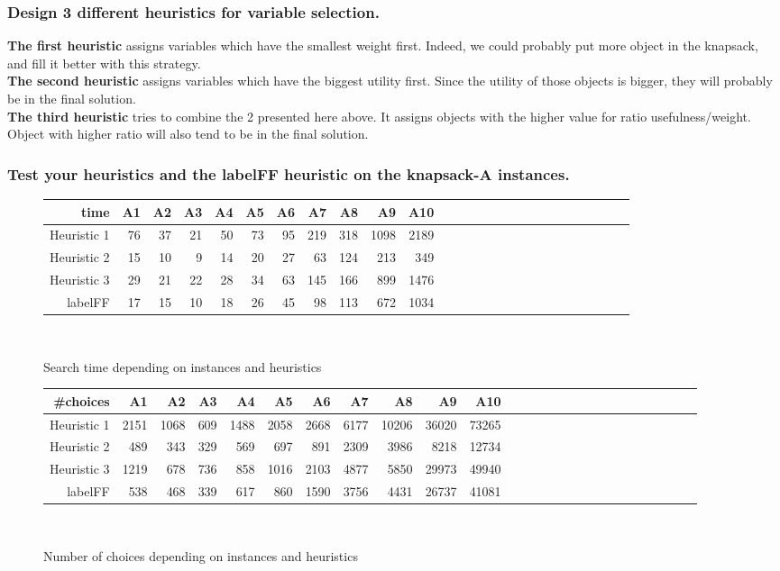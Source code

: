 \documentclass[a4paper ,12pt,french]{article}
\begin{document}
\subsubsection{Design 3 different heuristics for variable selection.}
\textbf{The first heuristic} assigns variables which have the smallest weight first. Indeed, we could probably put more object in the knapsack, and fill it better with this strategy.\\

\textbf{The second heuristic} assigns variables which have the biggest utility first. Since the utility of those objects is bigger, they will probably be in the final solution.\\

\textbf{The third heuristic} tries to combine the 2 presented here above. It assigns objects with the higher value for ratio usefulness/weight. Object with higher ratio will also tend to be in the final solution.\\

\subsubsection{Test your heuristics and the labelFF heuristic on the knapsack-A instances.}

\begin{figure}[!h]
\begin{tabular}{|r||r|r|r|r|r|r|r|r|r|r|r|r|r|r|r|r|r|r|r|r|r|r|r|r|r|}
\hline
time&A1&A2&A3&A4&A5&A6&A7&A8&A9&A10\\
\hline
\hline
Heuristic 1&76&37&21&50&73&95&219&318&1098&2189\\
\hline
Heuristic 2&15&10&9&14&20&27&63&124&213&349\\
\hline
Heuristic 3&29&21&22&28&34&63&145&166&899&1476\\
\hline
labelFF&17&15&10&18&26&45&98&113&672&1034\\
\hline
\end{tabular}\\
\caption{Search time depending on instances and heuristics}
\end{figure}


\begin{figure}[!h]
\begin{tabular}{|r||r|r|r|r|r|r|r|r|r|r|r|r|r|r|r|r|r|r|r|r|r|r|r|r|r|}
\hline
\#choices&A1&A2&A3&A4&A5&A6&A7&A8&A9&A10\\
\hline
\hline
Heuristic 1&2151&1068&609&1488&2058&2668&6177&10206&36020&73265\\
\hline
Heuristic 2&489&343&329&569&697&891&2309&3986&8218&12734\\
\hline
Heuristic 3&1219&678&736&858&1016&2103&4877&5850&29973&49940\\
\hline
labelFF&538&468&339&617&860&1590&3756&4431&26737&41081\\
\hline

\end{tabular}\\
\caption{Number of choices depending on instances and heuristics}
\end{figure}
\end{document}
